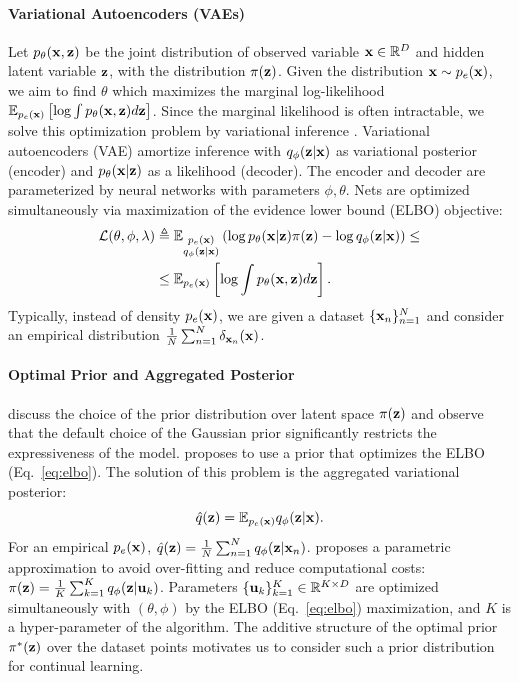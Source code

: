 \paragraph{Variational Autoencoders (VAEs)} Let $p_{\theta}({\mathbf{x}}, {\mathbf{z}})$ be the joint distribution of observed variable ${\mathbf{x}}\in\mathbb{R}^{D}$ and hidden latent variable ${\mathbf{z}}$, with the distribution $\pi({\mathbf{z}})$. Given the distribution ${\mathbf{x}}\sim p_{e}({\mathbf{x}})$, we aim to find $\theta$ which maximizes the marginal log-likelihood $ \mathbb{E}_{p_{e}({\mathbf{x}})}\left [\log \int p_{\theta}({\mathbf{x}}, {\mathbf{z}})d{\mathbf{z}}\right]$. Since the marginal likelihood is often intractable, we solve this optimization problem by variational inference \citep{jordan1999introduction}. Variational autoencoders (VAE) \citep{kingma2014autoencoding} amortize inference with $q_{\phi}({\mathbf{z}}|{\mathbf{x}})$ as variational posterior (encoder) and $p_{\theta}({\mathbf{x}}|{\mathbf{z}})$ as a likelihood (decoder). The encoder and decoder are parameterized by neural networks with parameters $\phi, \theta$. Nets are optimized simultaneously via maximization of the evidence lower bound (ELBO) objective:
\begin{equation}
\label{eq:elbo}
\begin{aligned}
    \mathcal{L}(\theta, \phi, \lambda) & \triangleq  \E_{\substack{p_{e}(\rvx)\\q_{\phi}(\rvz|\rvx)}}\left(\log p_{\theta}(\rvx|\rvz)\pi(\rvz) - \log q_{\phi}(\rvz|\rvx)\right) 
    \leq  \\
    & \leq  \E_{p_{e}(\rvx)}\left [\log \int p_{\theta}(\rvx, \rvz)d\rvz\right].
\end{aligned}
\end{equation}
Typically, instead of density $p_{e}({\mathbf{x}})$, we are given a dataset $\{{\mathbf{x}}_n\}_{n=1}^{N}$ and consider an empirical distribution $\tfrac{1}{N}\sum_{n=1}^{N}\delta_{{\mathbf{x}}_n}({\mathbf{x}})$.
\paragraph{Optimal Prior and Aggregated Posterior} \citet{hoffman2016elbo, goyal2017nonparametric} discuss the choice of the prior distribution over latent space $\pi({\mathbf{z}})$ and observe that the default choice of the Gaussian prior significantly restricts the expressiveness of the model. \citet{tomczak2017vae} proposes to use a prior that optimizes the ELBO (Eq.~\ref{eq:elbo}). The solution of this problem is the aggregated variational posterior:
\begin{equation}
\hat{q}({\mathbf{z}})=\mathbb{E}_{p_{e}({\mathbf{x}})}q_{\phi}({\mathbf{z}}|{\mathbf{x}}).
\end{equation}
For an empirical $p_e({\mathbf{x}})$, $\hat{q}({\mathbf{z}})=\tfrac{1}{N}\sum_{n=1}^{N}q_{\phi}({\mathbf{z}}|{\mathbf{x}}_n)$. \citet{tomczak2017vae} proposes a parametric approximation to avoid over-fitting and reduce computational costs: $\pi({\mathbf{z}}) = \frac{1}{K}\sum_{k=1}^{K}q_{\phi}({\mathbf{z}}|{\mathbf{u}}_k)$. 
Parameters $\{{\mathbf{u}}_k\}_{k=1}^{K}\in\mathbb{R}^{K\times D}$ are optimized simultaneously with $(\theta, \phi)$ by the ELBO (Eq.~\ref{eq:elbo}) maximization, and $K$ is a hyper-parameter of the algorithm. 
The additive structure of the optimal prior $\pi^{*}({\mathbf{z}})$ over the dataset points motivates us to consider such a prior distribution for continual learning.
